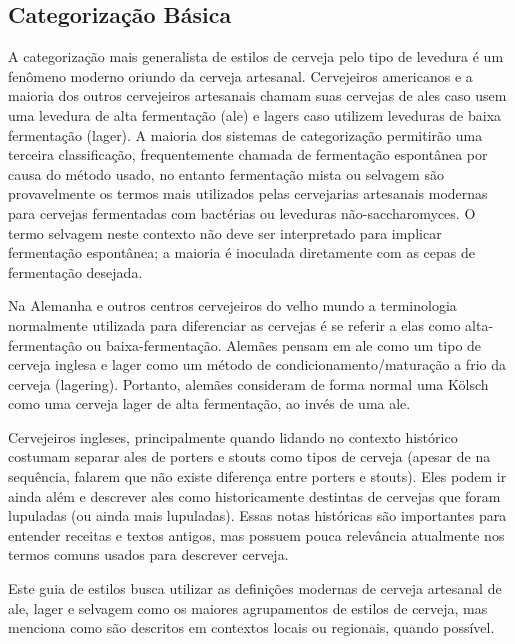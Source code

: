 \subsection*{Categorização Básica}
A categorização mais generalista de estilos de cerveja pelo tipo de levedura é um fenômeno moderno oriundo da cerveja artesanal. Cervejeiros americanos e a maioria dos outros cervejeiros artesanais chamam suas cervejas de ales caso usem uma levedura de alta fermentação (ale) e lagers caso utilizem leveduras de baixa fermentação (lager). A maioria dos sistemas de categorização permitirão uma terceira classificação, frequentemente chamada de fermentação espontânea por causa do método usado, no entanto fermentação mista ou selvagem são provavelmente os termos mais utilizados pelas cervejarias artesanais modernas para cervejas fermentadas com bactérias ou leveduras não-saccharomyces. O termo selvagem neste contexto não deve ser interpretado para implicar fermentação espontânea; a maioria é inoculada diretamente com as cepas de fermentação desejada.

Na Alemanha e outros centros cervejeiros do velho mundo a terminologia normalmente utilizada para diferenciar as cervejas é se referir a elas como alta-fermentação ou baixa-fermentação. Alemães pensam em ale como um tipo de cerveja inglesa e lager como um método de condicionamento/maturação a frio da cerveja (lagering). Portanto, alemães consideram de forma normal uma Kölsch como uma cerveja lager de alta fermentação, ao invés de uma ale.

Cervejeiros ingleses, principalmente quando lidando no contexto histórico costumam separar ales de porters e stouts como tipos de cerveja (apesar de na sequência, falarem que não existe diferença entre porters e stouts). Eles podem ir ainda além e descrever ales como historicamente destintas de cervejas que foram lupuladas (ou ainda mais lupuladas). Essas notas históricas são importantes para entender receitas e textos antigos, mas possuem pouca relevância atualmente nos termos comuns usados para descrever cerveja.

Este guia de estilos busca utilizar as definições modernas de cerveja artesanal de ale, lager e selvagem como os maiores agrupamentos de estilos de cerveja, mas menciona como são descritos em contextos locais ou regionais, quando possível.